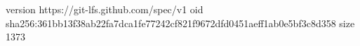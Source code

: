 version https://git-lfs.github.com/spec/v1
oid sha256:361bb13f38ab22fa7dca1fe77242cf821f9672dfd0451aeff1ab0e5bf3c8d358
size 1373
